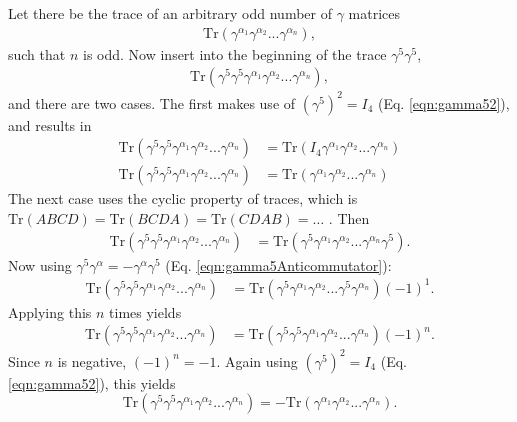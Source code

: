 \label{ssc:gammaOdd=0}

Let there be the trace of an arbitrary odd number of $\gamma$ matrices
\begin{align*}
\text{Tr}(\gamma^{\alpha_1} \gamma^{\alpha_2} ... \gamma^{\alpha_n}),
\end{align*}
such that $n$ is odd. Now insert into the beginning of the trace $\gamma^5
\gamma^5$,
\begin{align*}
\text{Tr}(\gamma^5 \gamma^5 \gamma^{\alpha_1} \gamma^{\alpha_2} ... \gamma^{\alpha_n}),\end{align*}
and there are two cases. The first makes use of $(\gamma^5)^2=I_4$ (Eq.
\ref{eqn:gamma52}), and
results in
\begin{align}\nonumber
\text{Tr}(\gamma^5 \gamma^5 \gamma^{\alpha_1} \gamma^{\alpha_2} ...
\gamma^{\alpha_n})&=\text{Tr}(I_4
\gamma^{\alpha_1} \gamma^{\alpha_2} ... \gamma^{\alpha_n})\\
\text{Tr}(\gamma^5 \gamma^5 \gamma^{\alpha_1} \gamma^{\alpha_2} ...
\gamma^{\alpha_n})&=\text{Tr}(\gamma^{\alpha_1} \gamma^{\alpha_2} ...
\gamma^{\alpha_n})
\label{eqn:traceOdd1}
\end{align}
The next case uses the cyclic property of traces, which is
$\text{Tr}(ABCD)=\text{Tr}(BCDA)=\text{Tr}(CDAB)=\ldots$ .
Then
\begin{align*}
\text{Tr}(\gamma^5 \gamma^5 \gamma^{\alpha_1} \gamma^{\alpha_2} ...
\gamma^{\alpha_n})&=\text{Tr}(\gamma^5
\gamma^{\alpha_1} \gamma^{\alpha_2} ... \gamma^{\alpha_n}\gamma^5).
\end{align*}
Now using $\gamma^5\gamma^\alpha = -\gamma^\alpha \gamma^5$ (Eq.
\ref{eqn:gamma5Anticommutator}):
\begin{align*}
\text{Tr}(\gamma^5 \gamma^5 \gamma^{\alpha_1} \gamma^{\alpha_2} ...
\gamma^{\alpha_n})&=\text{Tr}(\gamma^5
\gamma^{\alpha_1} \gamma^{\alpha_2} ... \gamma^5 \gamma^{\alpha_n})(-1)^1.
\end{align*}
Applying this $n$ times yields
\begin{align*}
\text{Tr}(\gamma^5 \gamma^5 \gamma^{\alpha_1} \gamma^{\alpha_2} ...
\gamma^{\alpha_n})&=\text{Tr}(\gamma^5
\gamma^5 \gamma^{\alpha_1} \gamma^{\alpha_2} ... \gamma^{\alpha_n})(-1)^n.
\end{align*}
Since $n$ is negative, $(-1)^n=-1$. Again using $(\gamma^5)^2=I_4$ (Eq.
\ref{eqn:gamma52}), this
yields
\begin{equation}\label{eqn:traceOdd2}
\text{Tr}(\gamma^5 \gamma^5 \gamma^{\alpha_1} \gamma^{\alpha_2} ...
\gamma^{\alpha_n})=-\text{Tr}(\gamma^{\alpha_1} \gamma^{\alpha_2} ...
\gamma^{\alpha_n}).
\end{equation}
